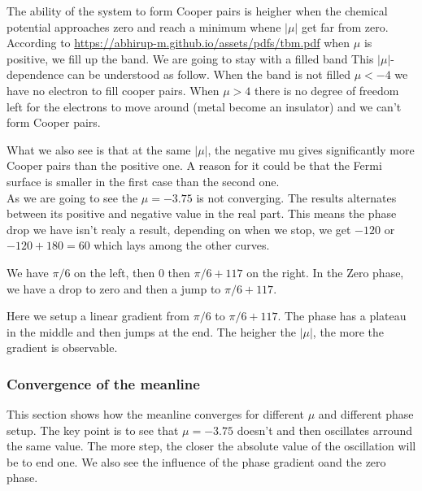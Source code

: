 \documentclass[../main.tex]{subfiles}
\begin{document}
The ability of the system to form Cooper pairs is heigher when the chemical potential approaches zero and reach a minimum 
whene $|\mu|$ get far from zero. According to \url{https://abhirup-m.github.io/assets/pdfs/tbm.pdf} when $\mu$ is positive,
we fill up the band. We are going to stay with a filled band This $|\mu|$-dependence can be understood
as follow. When the band is not filled $\mu<-4$ we have no electron to fill cooper pairs. When $\mu>4$ there is no degree of freedom
left for the electrons to move around (metal become an insulator) and we can't form Cooper pairs.

What we also see is that at the same $|\mu|$, the negative mu gives significantly more Cooper pairs than the positive one.
A reason for it could be that the Fermi surface is smaller in the first case than the second one.\\

As we are going to see the $\mu = -3.75$ is not converging. The results alternates between its positive and negative value in the real part.
This means the phase drop we have isn't realy a result, depending on when we stop, we get $-120$ or $-120+180 = 60$ which lays among the other curves. 




We have $\pi/6$ on the left, then $0$ then $\pi/6 + 117$ on the right. In the Zero phase, we have a drop to zero and then a jump to $\pi/6 + 117$.

Here we setup a linear gradient from $\pi/6$ to $\pi/6 + 117$. The phase has a plateau in the middle and then jumps at the end. The
heigher the $|\mu|$, the more the gradient is observable. 
\subsubsection{Convergence of the meanline} 

This section shows how the meanline converges for different $\mu$ and different phase setup. 
The key point is to see that $\mu = -3.75$ doesn't and then oscillates arround the same value. 
The more step, the closer the absolute value of the 
oscillation will be to end one. We also see the influence of the phase gradient oand the zero phase.\\
\end{document}
